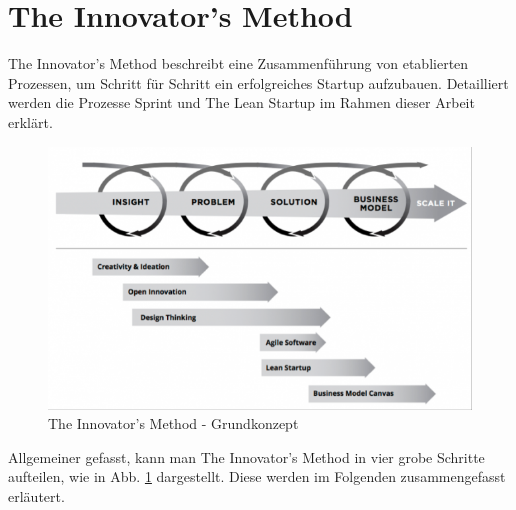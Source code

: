 \section{The Innovator's Method}

The Innovator's Method beschreibt eine Zusammenführung von etablierten Prozessen, um Schritt für Schritt ein erfolgreiches Startup aufzubauen.
Detailliert werden die Prozesse Sprint und The Lean Startup im Rahmen dieser Arbeit erklärt.

\begin{figure}[h!]
	\begin{center}
		\includegraphics[width=\textwidth]{99_IMG/02_Grundlagen/innovatorsMethod.png}
		\caption{The Innovator's Method - Grundkonzept}
		\label{TheInnovatorsMethod}
	\end{center}
\end{figure}

Allgemeiner gefasst, kann man The Innovator's Method in vier grobe Schritte aufteilen, wie in Abb. \ref{TheInnovatorsMethod} dargestellt. Diese werden im Folgenden zusammengefasst erläutert.

